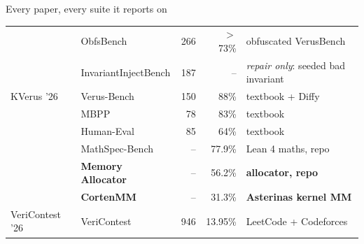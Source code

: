 \documentclass[aspectratio=169,10pt]{beamer}
\newcommand{\bad}[1]{{\color{lgRed}#1}}
\begin{document}
\begin{frame}{Every paper, every suite it reports on}
\begin{center}
{\begin{tabular}{@{}llrrl@{}}
                & ObfsBench               & 266   & $>$73\% & obfuscated VerusBench \\
                & InvariantInjectBench    & 187   & --     & \emph{repair only}: seeded bad invariant \\
\addlinespace[2pt]
KVerus '26      & Verus-Bench             & 150   & 88\%   & textbook + Diffy \\
                & MBPP                    & 78    & 83\%   & textbook \\
                & Human-Eval              & 85    & 64\%   & textbook \\
                & MathSpec-Bench          & --    & 77.9\% & Lean 4 maths, repo \\
                & \textbf{Memory Allocator} & --  & 56.2\% & \textbf{allocator, repo} \\
                & \textbf{CortenMM}       & --    & 31.3\% & \textbf{Asterinas kernel MM} \\
\addlinespace[2pt]
VeriContest '26 & VeriContest             & 946   & \bad{13.95\%} & LeetCode + Codeforces \\
\bottomrule
\end{tabular}
}
\end{center}

\end{frame}
\end{document}
